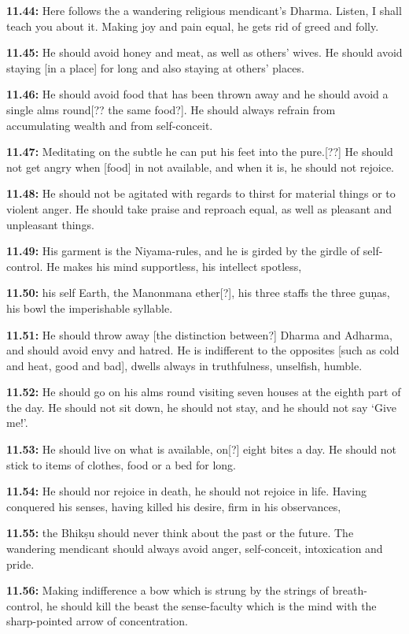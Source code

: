 \documentclass{article}
\newcommand{\vsnum}[1]{\textbf{#1}}
\begin{document}
\vsnum{11.44: }Here follows the a wandering religious mendicant's Dharma. Listen, I shall teach you about it. Making joy and pain equal, he gets rid of greed and folly.

\vsnum{11.45: }He should avoid honey and meat, as well as others' wives. He should avoid staying [in a place] for long and also staying at others' places.

\vsnum{11.46: }He should avoid food that has been thrown away and he should avoid a single alms round[?? the same food?]. He should always refrain from accumulating wealth and from self-conceit.

\vsnum{11.47: }Meditating on the subtle he can put his feet into the pure.[??] He should not get angry when [food] in not available, and when it is, he should not rejoice.

\vsnum{11.48: }He should not be agitated with regards to thirst for material things or to violent anger. He should take praise and reproach equal, as well as pleasant and unpleasant things.

\vsnum{11.49: }His garment is the Niyama-rules, and he is girded by the girdle of self-control. He makes his mind supportless, his intellect spotless,

\vsnum{11.50: }his self Earth, the Manonmana ether[?], his three staffs the three guṇas, his bowl the imperishable syllable.

\vsnum{11.51: }He should throw away [the distinction between?] Dharma and Adharma, and should avoid envy and hatred. He is indifferent to the opposites [such as cold and heat, good and bad], dwells always in truthfulness, unselfish, humble.

\vsnum{11.52: }He should go on his alms round visiting seven houses at the eighth part of the day. He should not sit down, he should not stay, and he should not say `Give me!'.

\vsnum{11.53: }He should live on what is available, on[?] eight bites a day. He should not stick to items of clothes, food or a bed for long.

\vsnum{11.54: }He should nor rejoice in death, he should not rejoice in life. Having conquered his senses, having killed his desire, firm in his observances,

\vsnum{11.55: }the Bhikṣu should never think about the past or the future. The wandering mendicant should always avoid anger, self-conceit, intoxication and pride.

\vsnum{11.56: }Making indifference a bow which is strung by the strings of breath-control, he should kill the beast the sense-faculty which is the mind with the sharp-pointed arrow of concentration.
\end{document}
